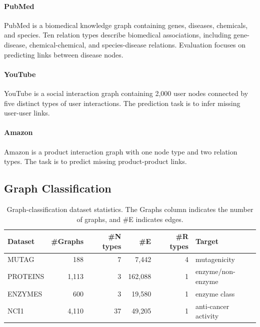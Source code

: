 \documentclass[sigconf,anonymous,review]{acmart}
\begin{document}
\paragraph{PubMed}
PubMed is a biomedical knowledge graph containing genes, diseases, chemicals,
and species. Ten relation types describe biomedical associations, including
gene-disease, chemical-chemical, and species-disease relations. Evaluation
focuses on predicting links between disease nodes.

\paragraph{YouTube}
YouTube is a social interaction graph containing 2,000 user nodes connected by
five distinct types of user interactions. The prediction task is to infer
missing user-user links.

\paragraph{Amazon}
Amazon is a product interaction graph with one node type and two relation types. The
task is to predict missing product-product links.

\subsection{Graph Classification}

\begin{table}[htbp]
  \centering
  \caption{Graph-classification dataset statistics. The Graphs column indicates the
  number of graphs, and \#E indicates edges.}
  \label{tab:graph-datasets}
  \scriptsize
  \setlength{\tabcolsep}{2.5pt}
  \resizebox{\columnwidth}{!}
  {%
  \begin{tabular}{lrrrrl}
    \toprule
    \textbf{Dataset} & \textbf{\#Graphs} & \textbf{\#N types} & \textbf{\#E} &
    \textbf{\#R types} & \textbf{Target} \\
    \midrule
    MUTAG & 188 & 7 & 7{,}442 & 4 & mutagenicity \\
    PROTEINS & 1{,}113 & 3 & 162{,}088 & 1 & enzyme/non-enzyme \\
    ENZYMES & 600 & 3 & 19{,}580 & 1 & enzyme class \\
    NCI1 & 4{,}110 & 37 & 49{,}205 & 1 & anti-cancer activity \\
    \bottomrule
  \end{tabular}%
  }
\end{table}
\end{document}
